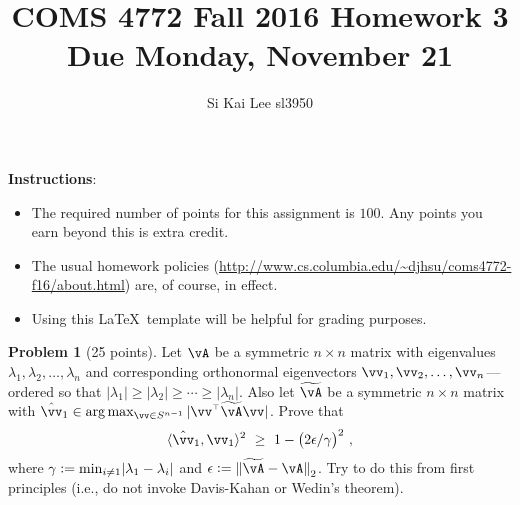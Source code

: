 \documentclass[11pt]{article}
\title{COMS 4772 Fall 2016 Homework 3 \\ Due Monday, November 21}
\author{Si Kai Lee sl3950
  }
\date{%
  }
\newcommand{\wt}{\ensuremath{\widetilde}}
\renewcommand\t{{\ensuremath{\scriptscriptstyle{\top}}}}
\newcommand\ip[1]{\langle #1 \rangle} %
\newcommand{\unitsphere}[1][d-1]{\ensuremath{S^{#1}}} %
\theoremstyle{definition}
\newtheorem{problem}{Problem}
\begin{document}
\maketitle

\noindent\textbf{Instructions}:
\begin{itemize}
  \item
    The required number of points for this assignment is $100$.
    Any points you earn beyond this is extra credit.

  \item
    The usual homework policies (\url{http://www.cs.columbia.edu/~djhsu/coms4772-f16/about.html}) are, of course, in effect.

  \item
    Using this \LaTeX\ template will be helpful for grading purposes.

\end{itemize}

\newpage


\begin{problem}[25 points]
  Let $\vA$ be a symmetric $n \times n$ matrix with eigenvalues $\lambda_1,
  \lambda_2, \dotsc, \lambda_n$ and corresponding orthonormal eigenvectors
  $\vv_1, \vv_2, \dotsc, \vv_n$---ordered so that $|\lambda_1| \geq |\lambda_2|
  \geq \dotsb \geq |\lambda_n|$.
  Also let $\wt\vA$ be a symmetric $n \times n$ matrix with $\hat\vv_1 \in
  \arg\max_{\vv \in \unitsphere[n-1]} \abs[0]{\vv^\t\wt\vA\vv}$.
  Prove that
  \begin{equation*}
    \ip{\hat\vv_1,\vv_1}^2
    \ \geq \ 1 - \del{2\epsilon/\gamma}^2
    \,,
  \end{equation*}
  where $\gamma := \min_{i \neq 1} \abs{\lambda_1 - \lambda_i}$ and $\epsilon :=
  \norm[0]{\wt\vA-\vA}_2$.
  Try to do this from first principles (i.e., do not invoke Davis-Kahan or
  Wedin's theorem).
\end{problem}
\end{document}
